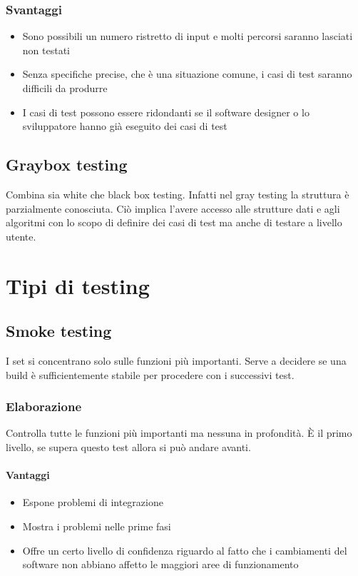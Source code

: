\documentclass[11pt,a4paper]{book}
\begin{document}
\subsubsection{Svantaggi}
\begin{itemize}
	\item Sono possibili un numero ristretto di input e molti percorsi saranno lasciati non testati
	\item Senza specifiche precise, che è una situazione comune, i casi di test saranno difficili da produrre
	\item I casi di test possono essere ridondanti se il software designer o lo sviluppatore hanno già eseguito dei casi di test
\end{itemize}

\subsection{Graybox testing}\label{par: graybox}
Combina sia white che black box testing. Infatti nel gray testing la struttura è parzialmente conosciuta. Ciò implica l'avere accesso alle strutture dati e agli algoritmi con lo scopo di definire dei casi di test ma anche di testare a livello utente.

\section{Tipi di testing}
\subsection{Smoke testing}
I set si concentrano solo sulle funzioni più importanti. Serve a decidere se una build è sufficientemente stabile per procedere con i successivi test.

\subsubsection{Elaborazione}
Controlla tutte le funzioni più importanti ma nessuna in profondità. È il primo livello, se supera questo test allora si può andare avanti.

\paragraph{Vantaggi}
\begin{itemize}
	\item Espone problemi di integrazione
	\item Mostra i problemi nelle prime fasi
	\item Offre un certo livello di confidenza riguardo al fatto che i cambiamenti del software non abbiano affetto le maggiori aree di funzionamento
\end{itemize}
\end{document}
